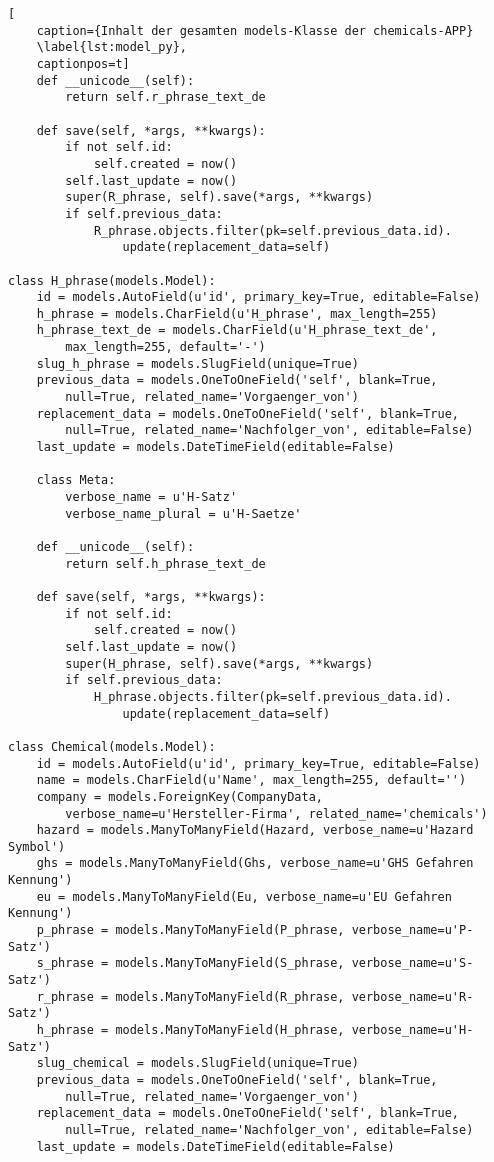 \begin{lstlisting}[
    caption={Inhalt der gesamten models-Klasse der chemicals-APP}
    \label{lst:model_py},
    captionpos=t]
    def __unicode__(self):
        return self.r_phrase_text_de

    def save(self, *args, **kwargs):
        if not self.id:
            self.created = now()
        self.last_update = now()
        super(R_phrase, self).save(*args, **kwargs)
        if self.previous_data:
            R_phrase.objects.filter(pk=self.previous_data.id).
                update(replacement_data=self)

class H_phrase(models.Model):
    id = models.AutoField(u'id', primary_key=True, editable=False)
    h_phrase = models.CharField(u'H_phrase', max_length=255)
    h_phrase_text_de = models.CharField(u'H_phrase_text_de', 
        max_length=255, default='-')
    slug_h_phrase = models.SlugField(unique=True)
    previous_data = models.OneToOneField('self', blank=True, 
        null=True, related_name='Vorgaenger_von')
    replacement_data = models.OneToOneField('self', blank=True, 
        null=True, related_name='Nachfolger_von', editable=False)
    last_update = models.DateTimeField(editable=False)

    class Meta:
        verbose_name = u'H-Satz'
        verbose_name_plural = u'H-Saetze'

    def __unicode__(self):
        return self.h_phrase_text_de

    def save(self, *args, **kwargs):
        if not self.id:
            self.created = now()
        self.last_update = now()
        super(H_phrase, self).save(*args, **kwargs)
        if self.previous_data:
            H_phrase.objects.filter(pk=self.previous_data.id).
                update(replacement_data=self)

class Chemical(models.Model):
    id = models.AutoField(u'id', primary_key=True, editable=False)
    name = models.CharField(u'Name', max_length=255, default='')
    company = models.ForeignKey(CompanyData, 
        verbose_name=u'Hersteller-Firma', related_name='chemicals')
    hazard = models.ManyToManyField(Hazard, verbose_name=u'Hazard Symbol')
    ghs = models.ManyToManyField(Ghs, verbose_name=u'GHS Gefahren Kennung')
    eu = models.ManyToManyField(Eu, verbose_name=u'EU Gefahren Kennung')
    p_phrase = models.ManyToManyField(P_phrase, verbose_name=u'P-Satz')
    s_phrase = models.ManyToManyField(S_phrase, verbose_name=u'S-Satz')
    r_phrase = models.ManyToManyField(R_phrase, verbose_name=u'R-Satz')
    h_phrase = models.ManyToManyField(H_phrase, verbose_name=u'H-Satz')    
    slug_chemical = models.SlugField(unique=True)
    previous_data = models.OneToOneField('self', blank=True, 
        null=True, related_name='Vorgaenger_von')
    replacement_data = models.OneToOneField('self', blank=True, 
        null=True, related_name='Nachfolger_von', editable=False)
    last_update = models.DateTimeField(editable=False)


\end{lstlisting}
